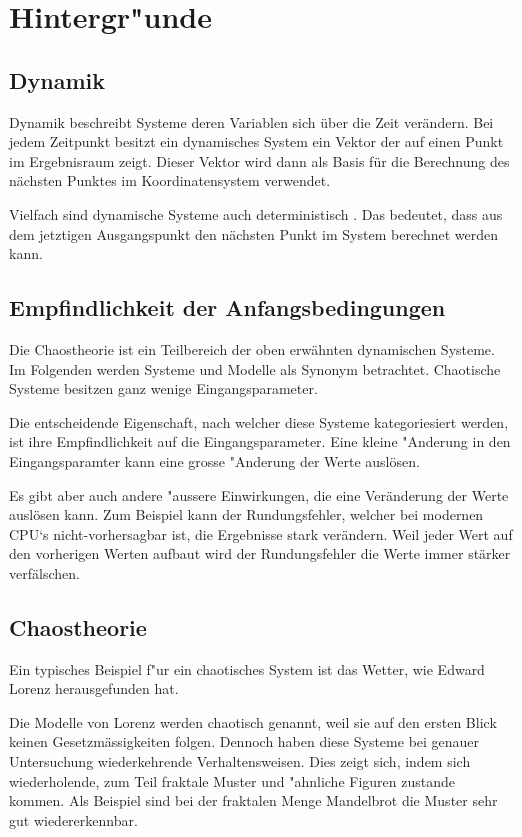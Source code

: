 
\section{Hintergr"unde}

\subsection{Dynamik} %
Dynamik beschreibt Systeme deren Variablen sich über die Zeit verändern. Bei jedem Zeitpunkt besitzt ein dynamisches System ein Vektor der auf einen Punkt im Ergebnisraum zeigt. Dieser Vektor wird dann als Basis für die Berechnung des nächsten Punktes im Koordinatensystem verwendet.

Vielfach sind dynamische Systeme auch deterministisch \cite{wikidynamicalsystems}. Das bedeutet, dass aus dem jetztigen Ausgangspunkt den nächsten Punkt im System berechnet werden kann.


\subsection{Empfindlichkeit der Anfangsbedingungen}
Die Chaostheorie ist ein Teilbereich der oben erwähnten dynamischen Systeme. Im Folgenden werden Systeme und Modelle als Synonym betrachtet. Chaotische Systeme besitzen ganz wenige Eingangsparameter.

Die entscheidende Eigenschaft, nach welcher diese Systeme kategoriesiert werden, ist ihre Empfindlichkeit auf die Eingangsparameter. Eine kleine "Anderung in den Eingangsparamter kann eine grosse "Anderung der Werte auslösen.

Es gibt aber auch andere "aussere Einwirkungen, die eine Veränderung der Werte auslösen kann. Zum Beispiel kann der Rundungsfehler, welcher bei modernen CPU‘s nicht-vorhersagbar ist, die Ergebnisse stark verändern. Weil jeder Wert auf den vorherigen Werten aufbaut wird der Rundungsfehler die Werte immer stärker verfälschen.

\subsection{Chaostheorie}
Ein typisches Beispiel f"ur ein chaotisches System ist das Wetter, wie Edward Lorenz herausgefunden hat. 

Die Modelle von Lorenz werden chaotisch genannt, weil sie auf den ersten Blick keinen Gesetzmässigkeiten folgen. Dennoch haben diese Systeme bei genauer Untersuchung wiederkehrende Verhaltensweisen. Dies zeigt sich, indem sich wiederholende, zum Teil fraktale Muster und "ahnliche Figuren zustande kommen. Als Beispiel sind bei der fraktalen Menge Mandelbrot die Muster sehr gut wiedererkennbar. 

